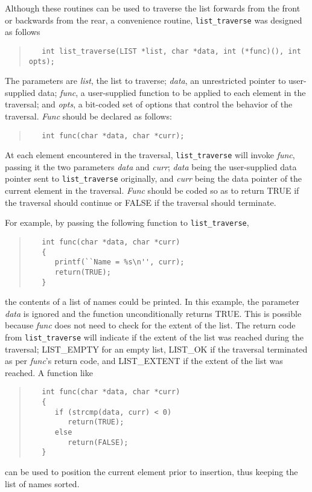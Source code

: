 \documentclass[fullpage,11pt]{article}
\begin{document}
Although these routines can be used to traverse the list forwards from the
front or backwards from the rear, a convenience routine, {\tt list\_traverse}
was designed as follows
\begin{quote}
\begin{verbatim}
   int list_traverse(LIST *list, char *data, int (*func)(), int opts);
\end{verbatim}
\end{quote}
The parameters are {\em list}, the list to traverse; {\em data}, an
unrestricted pointer to user-supplied data; {\em func}, a user-supplied
function to be applied to each element in the traversal; and {\em opts}, a
bit-coded set of options that control the behavior of the traversal.
{\em Func} should be declared as follows:
\begin{quote}
\begin{verbatim}
   int func(char *data, char *curr);
\end{verbatim}
\end{quote}
At each element encountered in the traversal, {\tt list\_traverse} will invoke
{\em func}, passing it the two parameters {\em data} and {\em curr}; {\em
data} being the user-supplied data pointer sent to {\tt list\_traverse}
originally, and {\em curr} being the data pointer of the current element in
the traversal.  {\em Func} should be coded so as to return TRUE if the
traversal should continue or FALSE if the traversal should terminate.

For example, by passing the following function to {\tt list\_traverse},
\begin{quote}
\begin{verbatim}
   int func(char *data, char *curr)
   {
      printf(``Name = %s\n'', curr);
      return(TRUE);
   }
\end{verbatim}
\end{quote}
the contents of a list of names could be printed.  In this example, the
parameter {\em data} is ignored and the function unconditionally returns TRUE.
This is possible because {\em func} does not need to check for the extent of
the list.  The return code from {\tt list\_traverse} will indicate if the
extent of the list was reached during the traversal; LIST\_EMPTY for an empty
list, LIST\_OK if the traversal terminated as per {\em func}'s return code,
and LIST\_EXTENT if the extent of the list was reached.  A function like
\begin{quote}
\begin{verbatim}
   int func(char *data, char *curr)
   {
      if (strcmp(data, curr) < 0)
         return(TRUE);
      else
         return(FALSE);
   }
\end{verbatim}
\end{quote}
can be used to position the current element prior to insertion, thus keeping
the list of names sorted.
\end{document}
